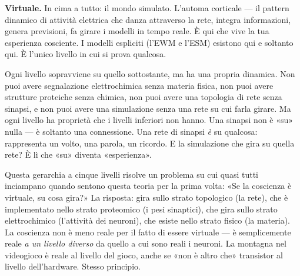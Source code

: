 \documentclass[11pt, twoside, openright]{book}
\begin{document}
\textbf{Virtuale.} In cima a tutto: il mondo simulato. L'automa corticale --- il pattern dinamico di attività elettrica che danza attraverso la rete, integra informazioni, genera previsioni, fa girare i modelli in tempo reale. È qui che vive la tua esperienza cosciente. I modelli espliciti (l'EWM e l'ESM) esistono qui e soltanto qui. È l'unico livello in cui si prova qualcosa.

Ogni livello sopravviene su quello sottostante, ma ha una propria dinamica. Non puoi avere segnalazione elettrochimica senza materia fisica, non puoi avere strutture proteiche senza chimica, non puoi avere una topologia di rete senza sinapsi, e non puoi avere una simulazione senza una rete su cui farla girare. Ma ogni livello ha proprietà che i livelli inferiori non hanno. Una sinapsi non è «su» nulla --- è soltanto una connessione. Una rete di sinapsi \textit{è} su qualcosa: rappresenta un volto, una parola, un ricordo. E la simulazione che gira su quella rete? È lì che «su» diventa «esperienza».

Questa gerarchia a cinque livelli risolve un problema su cui quasi tutti inciampano quando sentono questa teoria per la prima volta: «Se la coscienza è virtuale, su cosa gira?» La risposta: gira sullo strato topologico (la rete), che è implementato nello strato proteomico (i pesi sinaptici), che gira sullo strato elettrochimico (l'attività dei neuroni), che esiste nello strato fisico (la materia). La coscienza non è meno reale per il fatto di essere virtuale --- è semplicemente reale \textit{a un livello diverso} da quello a cui sono reali i neuroni. La montagna nel videogioco è reale al livello del gioco, anche se «non è altro che» transistor al livello dell'hardware. Stesso principio.
\end{document}
